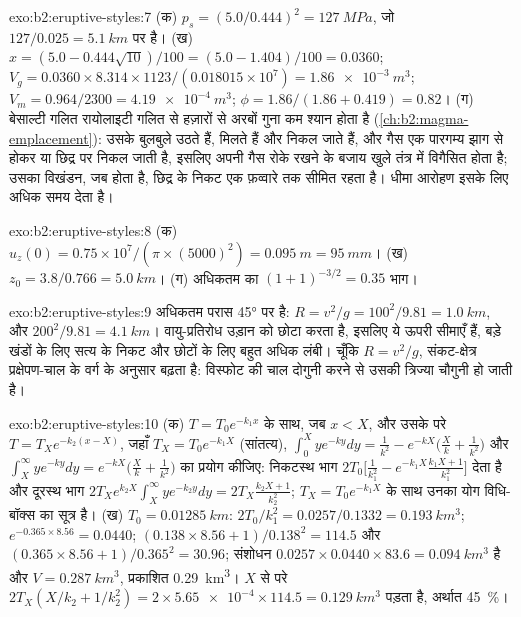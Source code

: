 \begin{solution}{exo:b2:eruptive-styles:7}
(क) $p_s = (5.0/0.444)^2 = \qty{127}{MPa}$, जो $127/0.025 = \qty{5.1}{km}$ पर है।
(ख) $x = (5.0 - 0.444\sqrt{10})/100 = (5.0 - 1.404)/100 = 0.0360$;
$V_g = 0.0360\times8.314\times1123/(0.018015\times10^7) = \qty{1.86e-3}{m^3}$;
$V_m = 0.964/2300 = \qty{4.19e-4}{m^3}$; $\phi = 1.86/(1.86 + 0.419) = 0.82$।
(ग) बेसाल्टी गलित रायोलाइटी गलित से हज़ारों से अरबों गुना कम श्यान होता है
(\cref{ch:b2:magma-emplacement}): उसके बुलबुले उठते हैं,
मिलते हैं और निकल जाते हैं, और गैस एक पारगम्य झाग से होकर या छिद्र पर
निकल जाती है, इसलिए  अपनी गैस रोके रखने के बजाय खुले तंत्र में विगैसित होता है; उसका
विखंडन, जब होता है, छिद्र के निकट एक फ़व्वारे तक सीमित रहता है। धीमा
आरोहण इसके लिए अधिक समय देता है।
\end{solution}

\begin{solution}{exo:b2:eruptive-styles:8}
(क) $u_z(0) = 0.75\times10^7/(\pi\times(5000)^2) = \qty{0.095}{m} = \qty{95}{mm}$।
(ख) $z_0 = 3.8/0.766 = \qty{5.0}{km}$। (ग) अधिकतम का $(1 + 1)^{-3/2} = 0.35$
भाग।
\end{solution}

\begin{solution}{exo:b2:eruptive-styles:9}
अधिकतम परास \ang{45} पर है: $R = v^2/g = 100^2/9.81 = \qty{1.0}{km}$, और
$200^2/9.81 = \qty{4.1}{km}$। वायु-प्रतिरोध उड़ान को छोटा करता है, इसलिए ये
ऊपरी सीमाएँ हैं, बड़े खंडों के लिए सत्य के निकट और छोटों के लिए बहुत अधिक लंबी।
चूँकि $R = v^2/g$, संकट-क्षेत्र प्रक्षेपण-चाल के वर्ग के अनुसार बढ़ता है:
विस्फोट की चाल दोगुनी करने से उसकी त्रिज्या चौगुनी हो जाती है।
\end{solution}

\begin{solution}{exo:b2:eruptive-styles:10}
(क) $T = T_0e^{-k_1x}$ के साथ, जब $x < X$, और उसके परे $T = T_Xe^{-k_2(x - X)}$, जहाँ $T_X =
T_0e^{-k_1X}$ (सांतत्य), $\int_0^X ye^{-ky}dy = \frac{1}{k^2} - e^{-kX}\big(\frac{X}{k} +
\frac{1}{k^2}\big)$ और $\int_X^\infty ye^{-ky}dy = e^{-kX}\big(\frac{X}{k} +
\frac{1}{k^2}\big)$ का प्रयोग कीजिए:
निकटस्थ भाग $2T_0\big[\frac{1}{k_1^2} - e^{-k_1X}\frac{k_1X + 1}{k_1^2}\big]$ देता है और
दूरस्थ भाग $2T_Xe^{k_2X}\int_X^\infty ye^{-k_2y}dy = 2T_X\frac{k_2X + 1}{k_2^2}$; $T_X =
T_0e^{-k_1X}$ के साथ उनका योग विधि-बॉक्स का सूत्र है।
(ख) $T_0 = \qty{0.01285}{km}$: $2T_0/k_1^2 = 0.0257/0.1332 = \qty{0.193}{km^3}$;
$e^{-0.365\times8.56} = 0.0440$; $(0.138\times8.56 + 1)/0.138^2 = 114.5$ और
$(0.365\times8.56 + 1)/0.365^2 = 30.96$; संशोधन $0.0257\times0.0440\times83.6
= \qty{0.094}{km^3}$ है और $V = \qty{0.287}{km^3}$, प्रकाशित \qty{0.29}{km^3}।
$X$ से परे $2T_X(X/k_2 + 1/k_2^2) = 2\times\num{5.65e-4}\times114.5 =
\qty{0.129}{km^3}$ पड़ता है, अर्थात \qty{45}{\percent}।
\end{solution}

